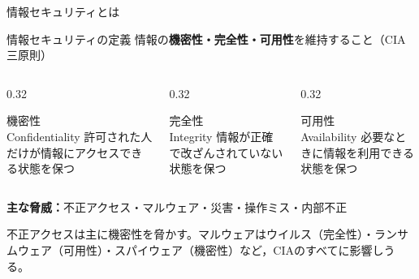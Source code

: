 \documentclass[aspectratio=43,professionalfonts,handout,10pt]{beamer}
\begin{document}
\begin{frame}{情報セキュリティとは}
  \begin{block}{情報セキュリティの定義}
    情報の\textbf{機密性・完全性・可用性}を維持すること（CIA三原則）
  \end{block}

  \vfill

  \begin{columns}[T]
    \begin{column}{0.32\textwidth}
      \begin{exampleblock}{機密性\\\small Confidentiality}
        \small
        許可された人だけが情報にアクセスできる状態を保つ
      \end{exampleblock}
    \end{column}
    \begin{column}{0.32\textwidth}
      \begin{exampleblock}{完全性\\\small Integrity}
        \small
        情報が正確で改ざんされていない状態を保つ
      \end{exampleblock}
    \end{column}
    \begin{column}{0.32\textwidth}
      \begin{exampleblock}{可用性\\\small Availability}
        \small
        必要なときに情報を利用できる状態を保つ
      \end{exampleblock}
    \end{column}
  \end{columns}

  {\small \textbf{主な脅威：}不正アクセス・マルウェア・災害・操作ミス・内部不正}

  \begin{slidenote}
    不正アクセスは主に機密性を脅かす。マルウェアはウイルス（完全性）・ランサムウェア（可用性）・スパイウェア（機密性）など，CIAのすべてに影響しうる。
  \end{slidenote}
\end{frame}

\end{document}
